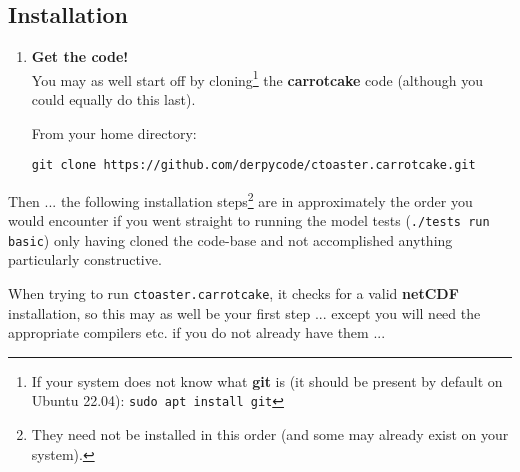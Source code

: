 \documentclass[10pt,twoside]{article}
\begin{document}
\subsection{Installation}
\vspace{1mm}

\begin{enumerate}[noitemsep]

\vspace{4pt}
\item \textbf{Get the code!}
\vspace{2pt}
\\You may as well start off by cloning\footnote{If your system does not know what \textbf{git} is (it should be present by default on Ubuntu 22.04): \texttt{sudo apt install git}} the \textbf{carrotcake} code (although you could equally do this last).

From your home directory:
\vspace{-2pt}
\begin{verbatim}
git clone https://github.com/derpycode/ctoaster.carrotcake.git
\end{verbatim}

\end{enumerate}

\vspace{4pt}

\noindent Then ... the following installation steps\footnote{They need not be installed in this order (and some may already exist on your system).}  are in approximately the order you would encounter if you went straight to running the model tests (\texttt{./tests run basic}) only having cloned the code-base and not accomplished anything particularly constructive.

\vspace{2pt}

\noindent When trying to run \texttt{ctoaster.carrotcake}, it checks for a valid \textbf{netCDF} installation, so this may as well be your first step ... except you will need the appropriate compilers etc. if you do not already have them ... 
\end{document}
